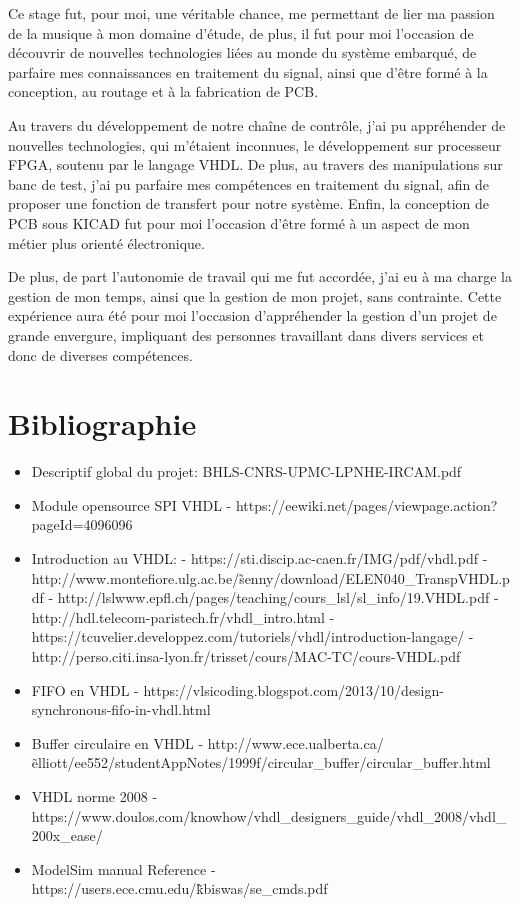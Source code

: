 \documentclass[french,a4paper,12pt]{report}
\begin{document}
Ce stage fut, pour moi, une véritable chance, me permettant de lier ma passion de la musique à mon domaine d'étude, de plus, il fut pour moi l'occasion de découvrir de nouvelles technologies liées au monde du système embarqué, de parfaire mes connaissances en traitement du signal, ainsi que d'être formé à la conception, au routage et à la fabrication de PCB.

Au travers du développement de notre chaîne de contrôle, j'ai pu appréhender de nouvelles technologies, qui m'étaient inconnues, le développement sur processeur FPGA, soutenu par le langage VHDL. De plus, au travers des manipulations sur banc de test, j'ai pu parfaire mes compétences en traitement du signal, afin de proposer une fonction de transfert pour notre système. Enfin, la conception de PCB sous KICAD fut pour moi l'occasion d'être formé à un aspect de mon métier plus orienté électronique.

De plus, de part l'autonomie de travail qui me fut accordée, j'ai eu à ma charge la gestion de mon temps, ainsi que la gestion de mon projet, sans contrainte. Cette expérience aura été pour moi l'occasion d'appréhender la gestion d'un projet de grande envergure, impliquant des personnes travaillant dans divers services et donc de diverses compétences.


\part{Bibliographie}

	\begin{itemize}
		\item Descriptif global du projet: BHLS-CNRS-UPMC-LPNHE-IRCAM.pdf
		\item Module opensource SPI VHDL - https://eewiki.net/pages/viewpage.action?pageId=4096096
		\item Introduction au VHDL:
						- https://sti.discip.ac-caen.fr/IMG/pdf/vhdl.pdf
						- http://www.montefiore.ulg.ac.be/\~senny/download/ELEN040\_TranspVHDL.pdf
						- http://lslwww.epfl.ch/pages/teaching/cours\_lsl/sl\_info/19.VHDL.pdf
						- http://hdl.telecom-paristech.fr/vhdl\_intro.html
						- https://tcuvelier.developpez.com/tutoriels/vhdl/introduction-langage/
						- http://perso.citi.insa-lyon.fr/trisset/cours/MAC-TC/cours-VHDL.pdf
		\item FIFO en VHDL - https://vlsicoding.blogspot.com/2013/10/design-synchronous-fifo-in-vhdl.html
		\item Buffer circulaire en VHDL - http://www.ece.ualberta.ca/\~elliott/ee552/studentAppNotes/1999f/circular\_buffer/circular\_buffer.html
		\item VHDL norme 2008 - https://www.doulos.com/knowhow/vhdl\_designers\_guide/vhdl\_2008/vhdl\_200x\_ease/
		\item ModelSim manual Reference - https://users.ece.cmu.edu/\~kbiswas/se\_cmds.pdf
	\end{itemize}
\end{document}
